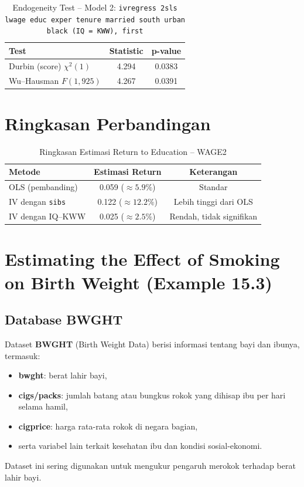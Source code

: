 \documentclass[]{article}
\begin{document}
\begin{table}[htbp]\centering
\caption{Endogeneity Test -- Model 2: \texttt{ivregress 2sls lwage educ exper tenure married south urban black (IQ = KWW), first}}
\begin{tabular}{lcc}
\toprule
\textbf{Test} & \textbf{Statistic} & \textbf{p-value} \\
\midrule
Durbin (score) $\chi^2(1)$ & 4.294 & 0.0383 \\
Wu--Hausman $F(1,925)$     & 4.267 & 0.0391 \\
\bottomrule
\end{tabular}
\end{table}

\section*{Ringkasan Perbandingan}
\begin{table}[h!]
\centering
\caption{Ringkasan Estimasi Return to Education -- WAGE2}
\begin{tabular}{@{}lcc@{}}
\toprule
Metode & Estimasi Return & Keterangan \\
\midrule
OLS (pembanding) & 0.059 ($\approx 5.9\%$) & Standar \\
IV dengan \texttt{sibs} & 0.122 ($\approx 12.2\%$) & Lebih tinggi dari OLS \\
IV dengan IQ--KWW & 0.025 ($\approx 2.5\%$) & Rendah, tidak signifikan \\
\bottomrule
\end{tabular}
\end{table}
\section*{Estimating the Effect of Smoking on Birth Weight (Example 15.3)}

\subsection*{Database BWGHT}
Dataset \textbf{BWGHT} (Birth Weight Data) berisi informasi tentang bayi dan ibunya, termasuk:
\begin{itemize}
    \item \textbf{bwght}: berat lahir bayi,
    \item \textbf{cigs/packs}: jumlah batang atau bungkus rokok yang dihisap ibu per hari selama hamil,
    \item \textbf{cigprice}: harga rata-rata rokok di negara bagian,
    \item serta variabel lain terkait kesehatan ibu dan kondisi sosial-ekonomi.
\end{itemize}
Dataset ini sering digunakan untuk mengukur pengaruh merokok terhadap berat lahir bayi.
\end{document}
